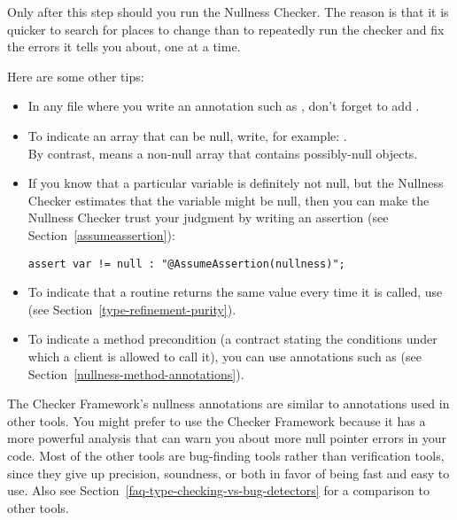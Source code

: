 Only after this step should you run
the Nullness Checker.  The reason is that it is quicker to search for
places to change than to repeatedly run the checker and fix the errors it
tells you about, one at a time.

Here are some other tips:
\begin{itemize}
\item
    \begin{sloppypar}
    In any file where you write an annotation such as ,
    don't forget to add .
    \end{sloppypar}
\item
    To indicate an array that can be null, write, for example: . \\
    By contrast,  means a non-null array that
    contains possibly-null objects.
\item
    If you know that a particular variable is definitely not null, but the
    Nullness Checker estimates that the variable might be null, then you can
    make the Nullness Checker trust your judgment by writing
    an assertion (see Section~\ref{assumeassertion}):
\begin{Verbatim}
assert var != null : "@AssumeAssertion(nullness)";
\end{Verbatim}
\item
    To indicate that a routine returns the same value every time it is
    called, use  (see Section~\ref{type-refinement-purity}).
\item
    To indicate a method precondition (a contract stating the conditions
    under which a client is allowed to call it), you can use annotations
    such as  (see Section~\ref{nullness-method-annotations}).
\end{itemize}




\newcommand{\linktoNonNull}{\refclass{checker/nullness/qual}{NonNull}}
\newcommand{\linktoNullable}{\refclass{checker/nullness/qual}{Nullable}}

The Checker Framework's nullness annotations are similar to annotations used
in other
tools.
You might prefer to use the Checker Framework because it has a more
powerful analysis that can warn you about more null pointer errors in your
code.
Most of the other tools are bug-finding tools rather than verification tools, since they
give up precision, soundness, or both in favor of being fast and
easy to use.  Also
see Section~\ref{faq-type-checking-vs-bug-detectors} for a comparison to other tools.

